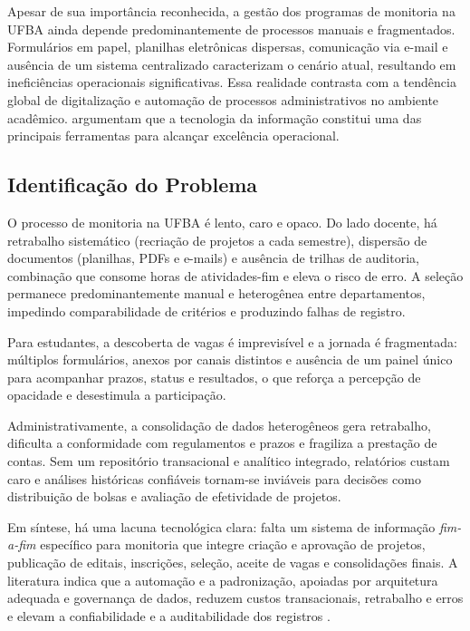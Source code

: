 \documentclass[portuguese]{sbc2025}%
\begin{document}
Apesar de sua importância reconhecida, a gestão dos programas de monitoria na UFBA ainda depende predominantemente de processos manuais e fragmentados. Formulários em papel, planilhas eletrônicas dispersas, comunicação via e-mail e ausência de um sistema centralizado caracterizam o cenário atual, resultando em ineficiências operacionais significativas. Essa realidade contrasta com a tendência global de digitalização e automação de processos administrativos no ambiente acadêmico. \citet{Laudon_Laudon_2011} argumentam que a tecnologia da informação constitui uma das principais ferramentas para alcançar excelência operacional.

\subsection{Identificação do Problema}

O processo de monitoria na UFBA é lento, caro e opaco. Do lado docente, há retrabalho sistemático (recriação de projetos a cada semestre), dispersão de documentos (planilhas, PDFs e e-mails) e ausência de trilhas de auditoria, combinação que consome horas de atividades-fim e eleva o risco de erro. A seleção permanece predominantemente manual e heterogênea entre departamentos, impedindo comparabilidade de critérios e produzindo falhas de registro.

Para estudantes, a descoberta de vagas é imprevisível e a jornada é fragmentada: múltiplos formulários, anexos por canais distintos e ausência de um painel único para acompanhar prazos, status e resultados, o que reforça a percepção de opacidade e desestimula a participação.

Administrativamente, a consolidação de dados heterogêneos gera retrabalho, dificulta a conformidade com regulamentos e prazos e fragiliza a prestação de contas. Sem um repositório transacional e analítico integrado, relatórios custam caro e análises históricas confiáveis tornam-se inviáveis para decisões como distribuição de bolsas e avaliação de efetividade de projetos.

Em síntese, há uma lacuna tecnológica clara: falta um sistema de informação \textit{fim-a-fim} específico para monitoria que integre criação e aprovação de projetos, publicação de editais, inscrições, seleção, aceite de vagas e consolidações finais. A literatura indica que a automação e a padronização, apoiadas por arquitetura adequada e governança de dados, reduzem custos transacionais, retrabalho e erros e elevam a confiabilidade e a auditabilidade dos registros \cite{Davenport1993, Hammer1993, Laudon_Laudon_2011, WorldBank2022, UNESCO2023}.
\end{document}
